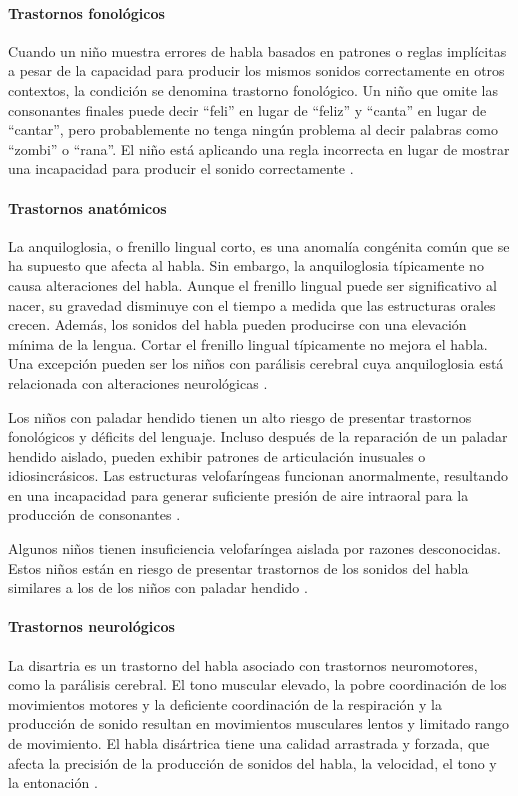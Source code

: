 \paragraph{Trastornos fonológicos}
Cuando un niño muestra errores de habla basados en patrones o reglas implícitas
a pesar de la capacidad para producir los mismos sonidos correctamente en otros
contextos, la condición se denomina trastorno fonológico. Un niño que omite las
consonantes finales puede decir ``feli'' en lugar de ``feliz'' y ``canta'' en
lugar de ``cantar'', pero probablemente no tenga ningún problema al decir
palabras como ``zombi'' o ``rana''. El niño está aplicando una regla incorrecta
en lugar de mostrar una incapacidad para producir el sonido correctamente
\cite{Feldman44}.

\paragraph{Trastornos anatómicos}
La anquiloglosia, o frenillo lingual corto, es una anomalía congénita común
que se ha supuesto que afecta al habla. Sin embargo, la anquiloglosia
típicamente no causa alteraciones del habla. Aunque el frenillo lingual puede
ser significativo al nacer, su gravedad disminuye con el tiempo a medida que
las estructuras orales crecen. Además, los sonidos del habla pueden producirse
con una elevación mínima de la lengua. Cortar el frenillo lingual
típicamente no mejora el habla. Una excepción pueden ser los niños con
parálisis cerebral cuya anquiloglosia está relacionada con alteraciones
neurológicas \cite{Feldman44}.

Los niños con paladar hendido tienen un alto riesgo de presentar trastornos
fonológicos y déficits del lenguaje. Incluso después de la reparación de un
paladar hendido aislado, pueden exhibir patrones de articulación inusuales o
idiosincrásicos. Las estructuras velofaríngeas funcionan anormalmente,
resultando en una incapacidad para generar suficiente presión de aire
intraoral para la producción de consonantes \cite{Feldman44}.

Algunos niños tienen insuficiencia velofaríngea aislada por razones
desconocidas. Estos niños están en riesgo de presentar trastornos de los sonidos
del habla similares a los de los niños con paladar hendido \cite{Feldman44}.

\paragraph{Trastornos neurológicos}
La disartria es un trastorno del habla asociado con trastornos neuromotores,
como la parálisis cerebral. El tono muscular elevado, la pobre coordinación de
los movimientos motores y la deficiente coordinación de la respiración y la
producción de sonido resultan en movimientos musculares lentos y limitado rango
de movimiento. El habla disártrica tiene una calidad arrastrada y forzada, que
afecta la precisión de la producción de sonidos del habla, la velocidad, el
tono y la entonación \cite{Feldman44}.

